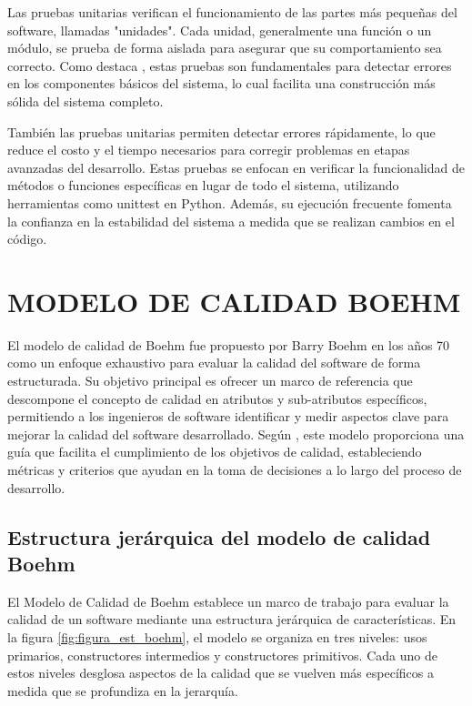 		Las pruebas unitarias verifican el funcionamiento de las partes más pequeñas del software, llamadas "unidades". Cada unidad, generalmente una función o un módulo, se prueba de forma aislada para asegurar que su comportamiento sea correcto. Como destaca \textcite{pressman2010ingenieria}, estas pruebas son fundamentales para detectar errores en los componentes básicos del sistema, lo cual facilita una construcción más sólida del sistema completo.
		
		También las pruebas unitarias permiten detectar errores rápidamente, lo que reduce el costo y el tiempo necesarios para corregir problemas en etapas avanzadas del desarrollo. Estas pruebas se enfocan en verificar la funcionalidad de métodos o funciones específicas en lugar de todo el sistema, utilizando herramientas como unittest en Python. Además, su ejecución frecuente fomenta la confianza en la estabilidad del sistema a medida que se realizan cambios en el código.	
	\section{MODELO DE CALIDAD BOEHM}
		El modelo de calidad de Boehm fue propuesto por Barry Boehm en los años 70 como un enfoque exhaustivo para evaluar la calidad del software de forma estructurada. Su objetivo principal es ofrecer un marco de referencia que descompone el concepto de calidad en atributos y sub-atributos específicos, permitiendo a los ingenieros de software identificar y medir aspectos clave para mejorar la calidad del software desarrollado. Según \textcite{pressman2010ingenieria}, este modelo proporciona una guía que facilita el cumplimiento de los objetivos de calidad, estableciendo métricas y criterios que ayudan en la toma de decisiones a lo largo del proceso de desarrollo.
	\subsection{Estructura jerárquica del modelo de calidad Boehm}
		El Modelo de Calidad de Boehm establece un marco de trabajo para evaluar la calidad de un software mediante una estructura jerárquica de características. En la figura \ref{fig:figura_est_boehm}, el modelo se organiza en tres niveles: usos primarios, constructores intermedios y constructores primitivos. Cada uno de estos niveles desglosa aspectos de la calidad que se vuelven más específicos a medida que se profundiza en la jerarquía.
				
